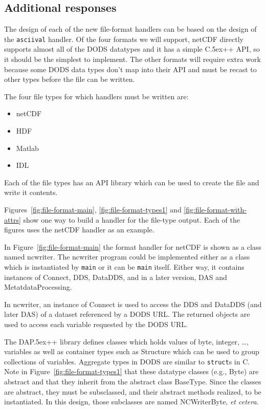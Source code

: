 \documentclass{article}
\newcommand{\Cpp}{\rm {\small C}\raise.5ex\hbox{\footnotesize ++}\xspace}
\newcommand{\dap}{\rm {\small DAP}\raise.5ex\hbox{\footnotesize ++}\xspace}
\begin{document}
\subsection{Additional responses}
\label{sec:add-resp}
The design of each of the new file-format handlers can be based on the design
of the \texttt{asciival} handler. Of the four formats we will support, netCDF
directly supports almost all of the DODS datatypes and it has a simple \Cpp
API, so it should be the simplest to implement. The other formats will
require extra work because some DODS data types don't map into their API and
must be recast to other types before the file can be written.

The four file types for which handlers must be written are:
\begin{itemize}
\item netCDF
\item HDF
\item Matlab
\item IDL
\end{itemize}

Each of the file types has an API library which can be used to create the
file and write it contents.

Figures~\ref{fig:file-format-main}, \ref{fig:file-format-types1} and
\ref{fig:file-format-with-attrs} show one way to build a handler for the
file-type output. Each of the figures uses the netCDF handler as an example.

In Figure~\ref{fig:file-format-main} the format handler for netCDF is shown
as a class named ncwriter. The ncwriter program could be implemented either
as a class which is instantiated by \texttt{main} or it can be \texttt{main}
itself.  Either way, it contains instances of Connect, DDS, DataDDS, and in a
later version, DAS and MetatdataProcessing.

In ncwriter, an instance of Connect is used to access the DDS and DataDDS
(and later DAS) of a dataset referenced by a DODS URL. The returned objects
are used to access each variable requested by the DODS URL.

The \dap library defines classes which holds values of byte, integer, \ldots,
variables as well as container types such as Structure which can be used to
group collections of variables. Aggregate types in DODS are similar to
\texttt{struct}s in C. Note in Figure~\ref{fig:file-format-types1} that these
datatype classes (e.g., Byte) are abstract and that they inherit from the
abstract class BaseType. Since the classes are abstract, they must be
subsclassed, and their abstract methods realized, to be instantiated. In this
design, those subclasses are named NCWriterByte, \textit{et cetera}.
\end{document}
